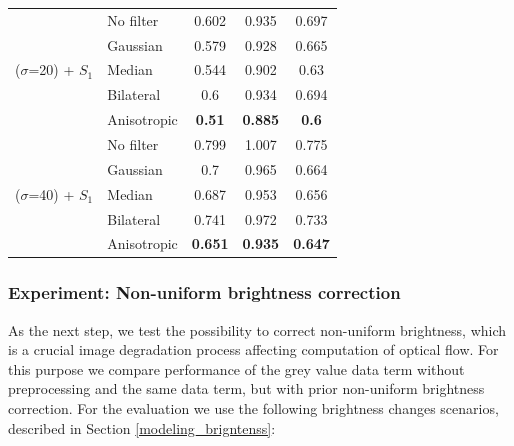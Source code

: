 \begin{table}[ht]
\begin{tabular}{rrcrr}
          \midrule
    \multirow{5}[2]{*}{($\sigma$=20) + $S_1$} & \multicolumn{1}{l}{No filter} & 0.602 & \multicolumn{1}{c}{0.935} & \multicolumn{1}{c}{0.697} \\
          & \multicolumn{1}{l}{Gaussian} & 0.579 & \multicolumn{1}{c}{0.928} & \multicolumn{1}{c}{0.665} \\
          & \multicolumn{1}{l}{Median} & 0.544 & \multicolumn{1}{c}{0.902} & \multicolumn{1}{c}{0.63} \\
          & \multicolumn{1}{l}{Bilateral} & 0.6   & \multicolumn{1}{c}{0.934} & \multicolumn{1}{c}{0.694} \\
          & \multicolumn{1}{l}{Anisotropic} & \textbf{0.51} & \multicolumn{1}{c}{\textbf{0.885}} & \multicolumn{1}{c}{\textbf{0.6}} \\
          \midrule
    \multirow{5}[1]{*}{($\sigma$=40) + $S_1$} & \multicolumn{1}{l}{No filter} & 0.799 & \multicolumn{1}{c}{1.007} & \multicolumn{1}{c}{0.775} \\
          & \multicolumn{1}{l}{Gaussian} & 0.7   & \multicolumn{1}{c}{0.965} & \multicolumn{1}{c}{0.664} \\
          & \multicolumn{1}{l}{Median} & 0.687 & \multicolumn{1}{c}{0.953} & \multicolumn{1}{c}{0.656} \\
          & \multicolumn{1}{l}{Bilateral} & 0.741 & \multicolumn{1}{c}{0.972} & \multicolumn{1}{c}{0.733} \\
          & \multicolumn{1}{l}{Anisotropic} & \textbf{0.651} & \multicolumn{1}{c}{\textbf{0.935}} & \multicolumn{1}{c}{\textbf{0.647}} \\
    \bottomrule
    \end{tabular}%
  \label{tab:exp_filter_noise_gauss_spike}%
\end{table}%





\subsubsection{Experiment: Non-uniform brightness correction}
\label{experiment_nonuniform_brightness}

As the next step, we test the possibility to correct non-uniform brightness, which is a crucial image degradation process affecting computation of optical flow. For this purpose we compare performance of the grey value data term without preprocessing and the same data term, but with prior non-uniform brightness correction. For the evaluation we use the following brightness changes scenarios, described in Section \ref{modeling_brigntenss}:

